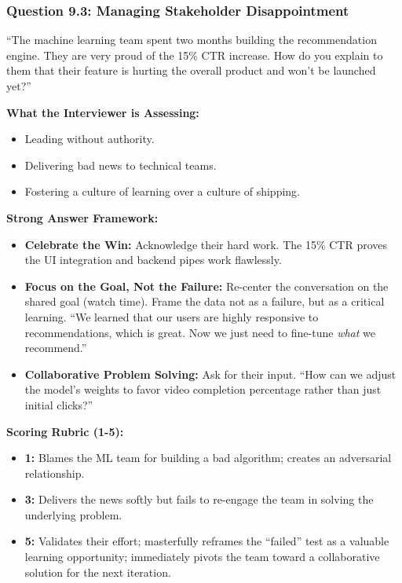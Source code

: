 \subsubsection{Question 9.3: Managing Stakeholder
Disappointment}\label{question-9.3-managing-stakeholder-disappointment}

``The machine learning team spent two months building the recommendation
engine. They are very proud of the 15\% CTR increase. How do you explain
to them that their feature is hurting the overall product and won't be
launched yet?''

\textbf{What the Interviewer is Assessing:}

\begin{itemize}
\tightlist
\item
  Leading without authority.
\item
  Delivering bad news to technical teams.
\item
  Fostering a culture of learning over a culture of shipping.
\end{itemize}

\textbf{Strong Answer Framework:}

\begin{itemize}
\tightlist
\item
  \textbf{Celebrate the Win:} Acknowledge their hard work. The 15\% CTR
  proves the UI integration and backend pipes work flawlessly.
\item
  \textbf{Focus on the Goal, Not the Failure:} Re-center the
  conversation on the shared goal (watch time). Frame the data not as a
  failure, but as a critical learning. ``We learned that our users are
  highly responsive to recommendations, which is great. Now we just need
  to fine-tune \emph{what} we recommend.''
\item
  \textbf{Collaborative Problem Solving:} Ask for their input. ``How can
  we adjust the model's weights to favor video completion percentage
  rather than just initial clicks?''
\end{itemize}

\textbf{Scoring Rubric (1-5):}

\begin{itemize}
\tightlist
\item
  \textbf{1:} Blames the ML team for building a bad algorithm; creates
  an adversarial relationship.
\item
  \textbf{3:} Delivers the news softly but fails to re-engage the team
  in solving the underlying problem.
\item
  \textbf{5:} Validates their effort; masterfully reframes the
  ``failed'' test as a valuable learning opportunity; immediately pivots
  the team toward a collaborative solution for the next iteration.
\end{itemize}


